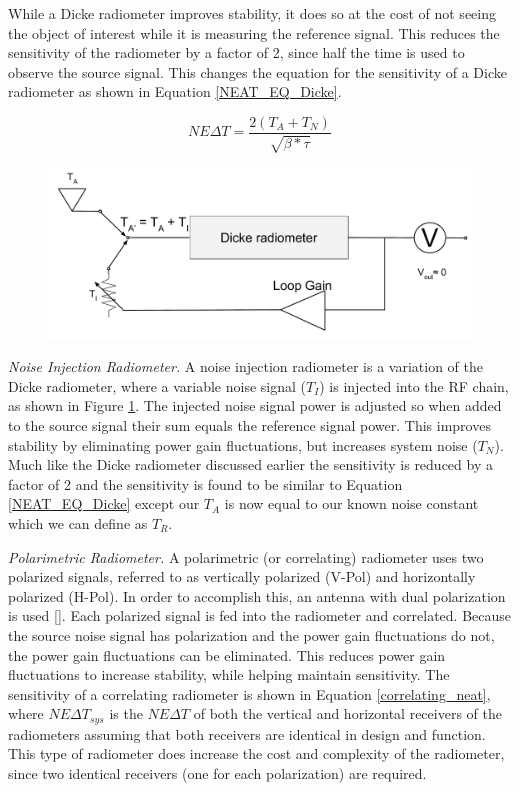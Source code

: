 While a Dicke radiometer improves stability, it does so at the cost of not seeing the object of interest while it is measuring the reference signal.  This reduces the sensitivity of the radiometer by a factor of 2, since half the time is used to observe the source signal.  This changes the equation for the sensitivity of a Dicke radiometer as shown in Equation \ref{NEAT_EQ_Dicke}.

\begin{equation} \label{NEAT_EQ_Dicke}
NE\Delta T=\frac{2(T_{A}+T_{N})}{\sqrt{\beta * \tau}} 
\end{equation}

{\begin{figure}[h!tb] 
\centering
\includegraphics[width=\textwidth]{Images/Noise_inj_radiometer.pdf}
\label{NoiseInj_radiometer}
\end{figure}
}

\emph{Noise Injection Radiometer.}  A noise injection radiometer is a variation of the Dicke radiometer, where a variable noise signal ($T_I$) is injected into the RF chain, as shown in Figure \ref{NoiseInj_radiometer}.  The injected noise signal power is adjusted so when added to the source signal their sum equals the reference signal power.  This improves stability by eliminating power gain fluctuations, but increases system noise ($T_N$).  Much like the Dicke radiometer discussed earlier the sensitivity is reduced by a factor of 2 and the sensitivity is found to be similar to Equation \ref{NEAT_EQ_Dicke} except our $T_A$ is now equal to our known noise constant which we can define as $T_R$.

\emph{Polarimetric Radiometer.} A polarimetric (or correlating) radiometer uses two polarized signals, referred to as vertically polarized (V-Pol) and horizontally polarized (H-Pol).  In order to accomplish this, an antenna with dual polarization is used [\cite{Fujimoto}].  Each polarized signal is fed into the radiometer and correlated.  Because the source noise signal has polarization and the power gain fluctuations do not, the power gain fluctuations can be eliminated.  This reduces power gain fluctuations to increase stability, while helping maintain sensitivity.  The sensitivity of a correlating radiometer is shown in Equation \ref{correlating_neat}, where $NE\Delta T_{sys}$ is the $NE\Delta T$ of both the vertical and horizontal receivers of the radiometers assuming that both receivers are identical in design and function. This type of radiometer does increase the cost and complexity  of the radiometer, since two identical receivers (one for each polarization) are required. 

